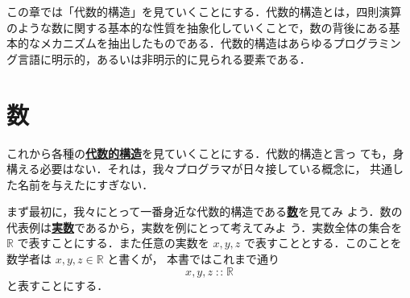 \documentclass[a5paper,twoside,fleqn,draft]{jsbook}
\newenvironment{leader}{\begingroup\gt}{\endgroup}
\newcommand{\keyword}[1]{{\underline{\textbf{#1}}}}
\DeclareMathOperator{\mIn}{{:\!:}}
\newcommand{\mSpecialSet}[1]{\mathbb{#1}}
\newcommand{\mRSet}{\mSpecialSet{R}}
\begin{document}
\begin{leader}
この章では「代数的構造」を見ていくことにする．代数的構造とは，四則演算
のような数に関する基本的な性質を抽象化していくことで，数の背後にある基
本的なメカニズムを抽出したものである．代数的構造はあらゆるプログラミン
グ言語に明示的，あるいは非明示的に見られる要素である．
\end{leader}

\section{数}

これから各種の\keyword{代数的構造}を見ていくことにする．代数的構造と言っ
ても，身構える必要はない．それは，我々プログラマが日々接している概念に，
共通した名前を与えたにすぎない．

まず最初に，我々にとって一番身近な代数的構造である\keyword{数}を見てみ
よう．数の代表例は\keyword{実数}であるから，実数を例にとって考えてみよ
う．実数全体の集合を $\mRSet$ で表すことにする．また任意の実数を
$x,y,z$ で表すこととする．このことを数学者は $x,y,z\in\mRSet$ と書くが，
本書ではこれまで通り
\begin{equation}
x,y,z\mIn\mRSet
\end{equation}
と表すことにする．
\end{document}
